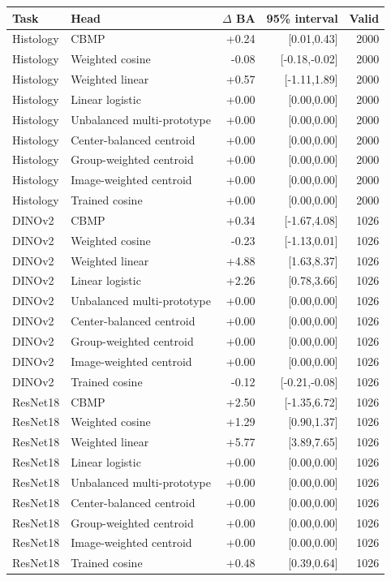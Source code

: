\begingroup\small\setlength{\tabcolsep}{4pt}
\begin{longtable}{llrrr}
\toprule
Task & Head & $\Delta$ BA & 95\% interval & Valid \\ \midrule
Histology & CBMP & +0.24 & [0.01,0.43] & 2000 \\
Histology & Weighted cosine & -0.08 & [-0.18,-0.02] & 2000 \\
Histology & Weighted linear & +0.57 & [-1.11,1.89] & 2000 \\
Histology & Linear logistic & +0.00 & [0.00,0.00] & 2000 \\
Histology & Unbalanced multi-prototype & +0.00 & [0.00,0.00] & 2000 \\
Histology & Center-balanced centroid & +0.00 & [0.00,0.00] & 2000 \\
Histology & Group-weighted centroid & +0.00 & [0.00,0.00] & 2000 \\
Histology & Image-weighted centroid & +0.00 & [0.00,0.00] & 2000 \\
Histology & Trained cosine & +0.00 & [0.00,0.00] & 2000 \\
DINOv2 & CBMP & +0.34 & [-1.67,4.08] & 1026 \\
DINOv2 & Weighted cosine & -0.23 & [-1.13,0.01] & 1026 \\
DINOv2 & Weighted linear & +4.88 & [1.63,8.37] & 1026 \\
DINOv2 & Linear logistic & +2.26 & [0.78,3.66] & 1026 \\
DINOv2 & Unbalanced multi-prototype & +0.00 & [0.00,0.00] & 1026 \\
DINOv2 & Center-balanced centroid & +0.00 & [0.00,0.00] & 1026 \\
DINOv2 & Group-weighted centroid & +0.00 & [0.00,0.00] & 1026 \\
DINOv2 & Image-weighted centroid & +0.00 & [0.00,0.00] & 1026 \\
DINOv2 & Trained cosine & -0.12 & [-0.21,-0.08] & 1026 \\
ResNet18 & CBMP & +2.50 & [-1.35,6.72] & 1026 \\
ResNet18 & Weighted cosine & +1.29 & [0.90,1.37] & 1026 \\
ResNet18 & Weighted linear & +5.77 & [3.89,7.65] & 1026 \\
ResNet18 & Linear logistic & +0.00 & [0.00,0.00] & 1026 \\
ResNet18 & Unbalanced multi-prototype & +0.00 & [0.00,0.00] & 1026 \\
ResNet18 & Center-balanced centroid & +0.00 & [0.00,0.00] & 1026 \\
ResNet18 & Group-weighted centroid & +0.00 & [0.00,0.00] & 1026 \\
ResNet18 & Image-weighted centroid & +0.00 & [0.00,0.00] & 1026 \\
ResNet18 & Trained cosine & +0.48 & [0.39,0.64] & 1026 \\
\bottomrule\end{longtable}\endgroup
